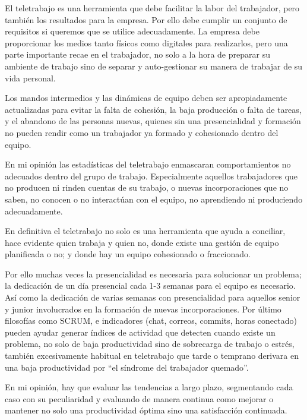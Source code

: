 El teletrabajo es una herramienta que debe facilitar la labor del trabajador, pero también los resultados para la empresa. Por ello debe cumplir un conjunto de requisitos si queremos que se utilice adecuadamente. La empresa debe proporcionar los medios tanto físicos como digitales para realizarlos, pero una parte importante recae en el trabajador, no solo a la hora de preparar su ambiente de trabajo sino de separar y auto-gestionar su manera de trabajar de su vida personal.

Los mandos intermedios y las dinámicas de equipo deben ser apropiadamente actualizadas para evitar la falta de cohesión, la baja producción o falta de tareas, y el abandono de las personas nuevas, quienes sin una presencialidad y formación no pueden rendir como un trabajador ya formado y cohesionado dentro del equipo.

En mi opinión las estadísticas del teletrabajo enmascaran comportamientos no adecuados dentro del grupo de trabajo. Especialmente aquellos trabajadores que no producen ni rinden cuentas de su trabajo, o nuevas incorporaciones que no saben, no conocen o no interactúan con el equipo, no aprendiendo ni produciendo adecuadamente. 

En definitiva el teletrabajo no solo es una herramienta que ayuda a conciliar, hace evidente quien trabaja y quien no, donde existe una gestión de equipo planificada o no;  y donde hay un equipo cohesionado o fraccionado. 

Por ello muchas veces la presencialidad es necesaria para solucionar un problema; la dedicación de un día presencial cada 1-3 semanas para el equipo es necesario. Así como la dedicación de varias semanas con presencialidad para aquellos senior y junior involucrados en la formación de nuevas incorporaciones. Por último filosofías como SCRUM, e indicadores  (chat, correos, commits, horas conectado) pueden ayudar generar índices de actividad que detecten cuando existe un problema, no solo de baja productividad sino de sobrecarga de trabajo o estrés, también excesivamente habitual en teletrabajo que tarde o temprano derivara en una baja productividad por “el síndrome del trabajador quemado”\cite{c_trabajador_quemado}.

En mi opinión, hay que evaluar las tendencias a largo plazo, segmentando cada caso con su peculiaridad y evaluando de manera continua como mejorar o mantener no solo una productividad óptima sino una satisfacción continuada.

